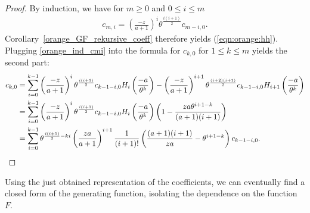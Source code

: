 \documentclass[12pt]{article}
\newcommand{\1}{\mathds{1}}
\theoremstyle{definition}
\theoremstyle{plain}
\theoremstyle{remark}
\begin{document}
    \begin{proof}
        By induction, we have for $m\ge 0$ and $0\le i \le m$
        \begin{align}\label{orange_ind_cmi}
            c_{m,i}
            =\left(\frac{-z}{a+1}\right)^i\theta^\frac{i(i+1)}{2}c_{m-i,0}.
        \end{align}
        Corollary~\ref{orange_GF_rekursive_coeff} therefore yields (\ref{eqn:orange:hh}). 
        Plugging \eqref{orange_ind_cmi} into the formula for $c_{k,0}$ for $1\le k\le m$ yields the second part: 
        \begin{align*}
            c_{k,0}
            &=\sum_{i=0}^{k-1}\left(\frac{-z}{a+1}\right)^i\theta^\frac{i(i+1)}{2}c_{k-1-i,0}H_i\left(\frac{-a}{\theta^k}\right)-\left(\frac{-z}{a+1}\right)^{i+1}\theta^\frac{(i+2)(i+1)}{2}c_{k-1-i,0}H_{i+1}\left(\frac{-a}{\theta^k}\right)   
            \\&=\sum_{i=0}^{k-1}\left(\frac{-z}{a+1}\right)^i\theta^\frac{i(i+1)}{2}c_{k-1-i,0}H_i\left(\frac{-a}{\theta^k}\right)\left(1-\frac{za\theta^{i+1-k}}{(a+1)(i+1)}\right)
            \\&=\sum_{i=0}^{k-1}\theta^{\frac{i(i+1)}{2}-ki}\left(\frac{za}{a+1}\right)^{i+1}\frac{1}{(i+1)!}\left(\frac{(a+1)(i+1)}{za}-\theta^{i+1-k}\right)c_{k-1-i,0}.\qedhere
        \end{align*}
    \end{proof}
Using the just obtained representation of the coefficients, we can eventually find a closed form of the generating function, isolating the dependence on the function $F$.
\end{document}
